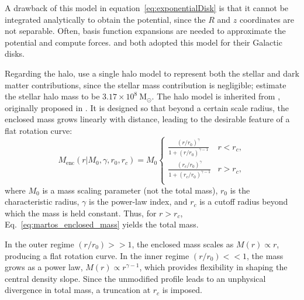         A drawback of this model in equation~\ref{eq:exponentialDisk} is that it cannot be integrated analytically to obtain the potential, since the $R$ and $z$ coordinates are not separable. Often, basis function expansions are needed to approximate the potential and compute forces. \citet{2017MNRAS.465...76M} and \citet{2024ApJ...967...89I} both adopted this model for their Galactic disks.

        Regarding the halo, \citet{2017A&A...598A..66P} use a single halo model to represent both the stellar and dark matter contributions, since the stellar mass contribution is negligible; \citet{2022A&A...667A..98R} estimate the stellar halo mass to be $3.17 \times 10^8~\mathrm{M}_\odot$. The halo model is inherited from \citet{1991RMxAA..22..255A}, originally proposed in \citet{1986RMxAA..13..137A}. It is designed so that beyond a certain scale radius, the enclosed mass grows linearly with distance, leading to the desirable feature of a flat rotation curve:
        \begin{equation} 
            M_{\mathrm{enc}}(r|M_0,\gamma,r_0,r_c) = M_0
            \begin{cases}
             \frac{\left(r/r_0\right)^\gamma}{1 + \left(r/r_0\right)^{\gamma - 1}} & r<r_c,\\
             \frac{\left(r_c/r_0\right)^\gamma}{1 + \left(r_c/r_0\right)^{\gamma - 1}} & r> r_c,\\
            \end{cases} 
            \label{eq:martos_enclosed_mass}
        \end{equation}
        where $M_0$ is a mass scaling parameter (not the total mass), $r_0$ is the characteristic radius, $\gamma$ is the power-law index, and $r_c$ is a cutoff radius beyond which the mass is held constant. Thus, for $r > r_c$, Eq.~\ref{eq:martos_enclosed_mass} yields the total mass. 

        In the outer regime $(r/r_0) >> 1$, the enclosed mass scales as $M(r) \propto r$, producing a flat rotation curve. In the inner regime $(r/r_0) << 1$, the mass grows as a power law, $M(r) \propto r^{\gamma - 1}$, which provides flexibility in shaping the central density slope. Since the unmodified profile leads to an unphysical divergence in total mass, a truncation at $r_c$ is imposed.

